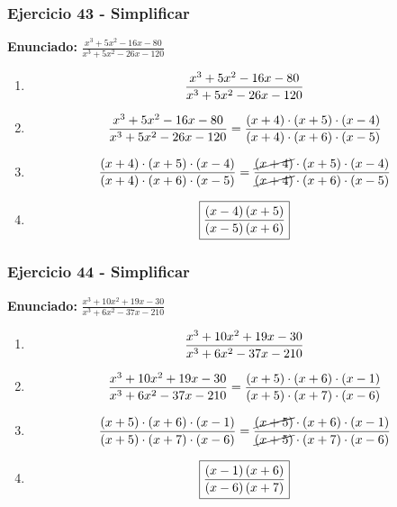 \documentclass[11pt,a4paper]{article}
\newcommand{\fitmath}[1]{%
\[
\setbox0=\hbox{$\displaystyle #1$}%
\ifdim\wd0>\linewidth
\resizebox{\linewidth}{!}{$\displaystyle #1$}%
\else
#1%
\fi
\]
}
\begin{document}
\vspace{0.12cm}
\subsubsection*{Ejercicio 43 - Simplificar}
\textbf{Enunciado:} $ \frac{x^{3} + 5 x^{2} - 16 x - 80}{x^{3} + 5 x^{2} - 26 x - 120} $\par
\begin{enumerate}[leftmargin=2em]
\item \fitmath{\frac{x^{3} + 5 x^{2} - 16 x - 80}{x^{3} + 5 x^{2} - 26 x - 120}}
\item \fitmath{\frac{x^{3} + 5 x^{2} - 16 x - 80}{x^{3} + 5 x^{2} - 26 x - 120}=\frac{\left(x + 4\right)\cdot \left(x + 5\right)\cdot \left(x - 4\right)}{\left(x + 4\right)\cdot \left(x + 6\right)\cdot \left(x - 5\right)}}
\item \fitmath{\frac{\left(x + 4\right)\cdot \left(x + 5\right)\cdot \left(x - 4\right)}{\left(x + 4\right)\cdot \left(x + 6\right)\cdot \left(x - 5\right)}=\frac{\cancel{\left(x + 4\right)}\cdot \left(x + 5\right)\cdot \left(x - 4\right)}{\cancel{\left(x + 4\right)}\cdot \left(x + 6\right)\cdot \left(x - 5\right)}}
\item \fitmath{\boxed{\frac{\left(x - 4\right) \left(x + 5\right)}{\left(x - 5\right) \left(x + 6\right)}}}
\end{enumerate}

\vspace{0.12cm}
\subsubsection*{Ejercicio 44 - Simplificar}
\textbf{Enunciado:} $ \frac{x^{3} + 10 x^{2} + 19 x - 30}{x^{3} + 6 x^{2} - 37 x - 210} $\par
\begin{enumerate}[leftmargin=2em]
\item \fitmath{\frac{x^{3} + 10 x^{2} + 19 x - 30}{x^{3} + 6 x^{2} - 37 x - 210}}
\item \fitmath{\frac{x^{3} + 10 x^{2} + 19 x - 30}{x^{3} + 6 x^{2} - 37 x - 210}=\frac{\left(x + 5\right)\cdot \left(x + 6\right)\cdot \left(x - 1\right)}{\left(x + 5\right)\cdot \left(x + 7\right)\cdot \left(x - 6\right)}}
\item \fitmath{\frac{\left(x + 5\right)\cdot \left(x + 6\right)\cdot \left(x - 1\right)}{\left(x + 5\right)\cdot \left(x + 7\right)\cdot \left(x - 6\right)}=\frac{\cancel{\left(x + 5\right)}\cdot \left(x + 6\right)\cdot \left(x - 1\right)}{\cancel{\left(x + 5\right)}\cdot \left(x + 7\right)\cdot \left(x - 6\right)}}
\item \fitmath{\boxed{\frac{\left(x - 1\right) \left(x + 6\right)}{\left(x - 6\right) \left(x + 7\right)}}}
\end{enumerate}
\end{document}

